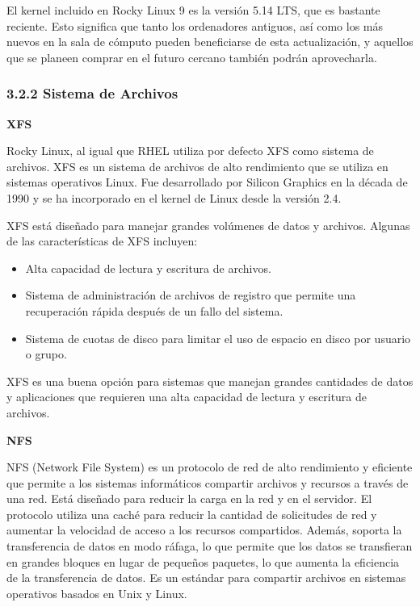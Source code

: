 \begin{spacing}{1.5}
  El kernel incluido en Rocky Linux 9 es la versión 5.14 LTS, que es bastante
  reciente. Esto significa que tanto los ordenadores antiguos, así como los más
  nuevos en la sala de cómputo pueden beneficiarse de esta actualización, y
  aquellos que se planeen comprar en el futuro cercano también podrán
  aprovecharla. \cite{RL9-release-1}

  \subsubsection{3.2.2 Sistema de Archivos}

  \textbf{XFS}

  Rocky Linux, al igual que RHEL utiliza por defecto XFS como sistema de
  archivos. XFS es un sistema de archivos de alto rendimiento que se utiliza en
  sistemas operativos Linux. Fue desarrollado por Silicon Graphics en la década
  de 1990 y se ha incorporado en el kernel de Linux desde la versión 2.4.

  XFS está diseñado para manejar grandes volúmenes de datos y archivos.
  Algunas de las características de XFS incluyen:

  \begin{itemize}
    \item Alta capacidad de lectura y escritura de archivos.
    \item Sistema de administración de archivos de registro que permite una
          recuperación rápida después de un fallo del sistema.
    \item Sistema de cuotas de disco para limitar el uso de espacio en
          disco por usuario o grupo.
  \end{itemize}

  XFS es una buena opción para sistemas que manejan grandes cantidades de
  datos y aplicaciones que requieren una alta capacidad de lectura y escritura de
  archivos. \cite{RHEL-XFS-1}

  \textbf{NFS}

  NFS (Network File System) es un protocolo de red de alto rendimiento y
  eficiente que permite a los sistemas informáticos compartir archivos y recursos
  a través de una red. Está diseñado para reducir la carga en la red y en el
  servidor. El protocolo utiliza una caché para reducir la cantidad de
  solicitudes de red y aumentar la velocidad de acceso a los recursos
  compartidos. Además, soporta la transferencia de datos en modo ráfaga, lo que
  permite que los datos se transfieran en grandes bloques en lugar de pequeños
  paquetes, lo que aumenta la eficiencia de la transferencia de datos. Es un
  estándar para compartir archivos en sistemas operativos basados en Unix y
  Linux.


\end{spacing}
